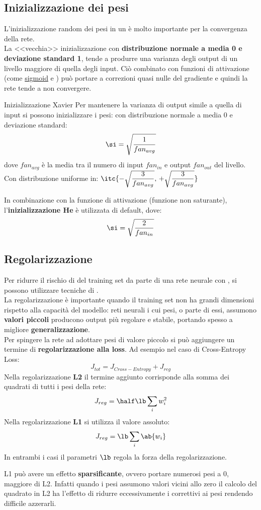 \subsection{Inizializzazione dei pesi}\label{sub:inizializzazione_dei_pesi} %
L'inizializzazione random dei pesi in un  è molto importante per la convergenza della rete.
\\
La <<vecchia>> inizializzazione con \textbf{distribuzione normale a media 0 e deviazione standard 1}, tende a produrre una varianza degli output di un livello maggiore di quella degli input.
Ciò combinato con funzioni di attivazione  (come \hyperref[par:sigmoid]{sigmoid} e ) può portare a correzioni quasi nulle del gradiente e quindi la rete tende a non convergere.
\emptyln{}
\begin{definition}{Inizializzazione Xavier}{}
    Per mantenere la varianza di output simile a quella di input si possono inizializzare i pesi: con distribuzione normale a media $0$ e deviazione standard:
    \[
        \si = \sqrt{\frac{1}{fan_{avg}}}
    \]
    dove $fan_{avg}$ è la media tra il numero di input $fan_{in}$ e output $fan_{out}$ del livello.
    \\
    Con distribuzione uniforme in: $\itc{-\sqrt{\dfrac{3}{fan_{avg}}},\,+\sqrt{\dfrac{3}{fan_{avg}}}}$
\end{definition}
In combinazione con la funzione di attivazione  (funzione non saturante), l'\textbf{inizializzazione He} è utilizzata di default, dove:
\[
    \si = \sqrt{\frac{2}{fan_{in}}}
\]
%
\subsection{Regolarizzazione}\label{sub:regolarizzazione} %
Per ridurre il rischio di  del training set da parte di una rete neurale con , si possono utilizzare tecniche di .
\\
La regolarizzazione è importante quando il training set non ha grandi dimensioni rispetto alla capacità del modello:
reti neurali i cui pesi, o parte di essi, assumono \textbf{valori piccoli} producono output più regolare e stabile, portando spesso a migliore \textbf{generalizzazione}.
\\
Per spingere la rete ad adottare pesi di valore piccolo si può aggiungere un termine di \textbf{regolarizzazione alla loss}.
Ad esempio nel caso di Cross-Entropy Loss:
\[
    J_{tot} = J_{Cross-Entropy} + J_{reg}
\]
Nella regolarizzazione \textbf{L2} il termine aggiunto corrisponde alla somma dei quadrati di tutti i pesi della rete:
\[
    J_{reg} = \half \lb\sum_iw_i^2
\]
Nella regolarizzazione \textbf{L1} si utilizza il valore assoluto:
\[
    J_{reg} = \lb\sum_i\ab{w_i}
\]
In entrambi i casi il parametri $\lb$ regola la forza della regolarizzazione.
\begin{note}
    L1 può avere un effetto \textbf{sparsificante}, ovvero portare numerosi pesi a $0$, maggiore di L2.
    Infatti quando i pesi assumono valori vicini allo zero il calcolo del quadrato in L2 ha l'effetto di ridurre eccessivamente i correttivi ai pesi rendendo difficile azzerarli.
\end{note}
%
